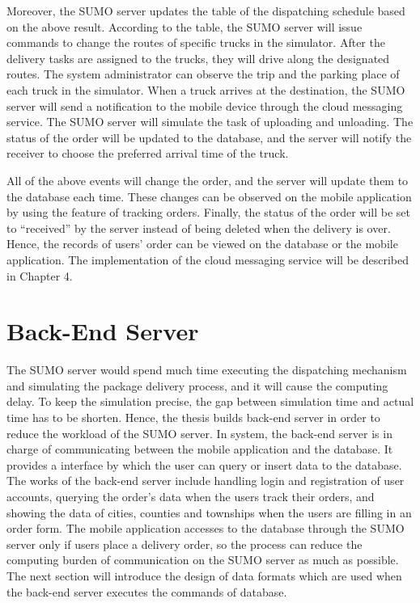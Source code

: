 \documentclass[12pt]{ksthesis}
\begin{document}
\begin{thesis}
{Moreover, the SUMO server updates the table of the dispatching schedule based on the above result. According to the table, the SUMO server will issue commands to change the routes of specific trucks in the simulator. After the delivery tasks are assigned to the trucks, they will drive along the designated routes. The system administrator can observe the trip and the parking place of each truck in the simulator. When a truck arrives at the destination, the SUMO server will send a notification to the mobile device through the cloud messaging service. The SUMO server will simulate the task of uploading and unloading. The status of the order will be updated to the database, and the server will notify the receiver to choose the preferred arrival time of the truck. 

All of the above events will change the order, and the server will update them to the database each time. These changes can be observed on the mobile application by using the feature of tracking orders. Finally, the status of the order will be set to “received” by the server instead of being deleted when the delivery is over. Hence, the records of users’ order can be viewed on the database or the mobile application. The implementation of the cloud messaging service will be described  in Chapter 4.

\section{Back-End Server}
The SUMO server would spend much time executing the dispatching mechanism and simulating the package delivery process, and it will cause the computing delay. To keep the simulation precise, the gap between simulation time and actual time has to be shorten. Hence, the thesis builds back-end server in order to reduce the workload of the SUMO server. In system, the back-end server is in charge of communicating between the mobile application and the database. It provides a interface by which the user can query or insert data to the database. The works of the back-end server include handling login and registration of user accounts, querying the order's data when the users track their orders, and showing the data of cities, counties and townships when the users are filling in an order form. 
The mobile application accesses to the database through the SUMO server only if users place a delivery order, so the process can reduce the computing burden of communication on the SUMO server as much as possible. The next section will introduce the design of data formats which are used when the back-end server executes the commands of database.




}
\end{thesis}
\end{document}
